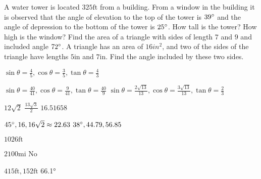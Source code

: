 \begin{Exercise}[title={Right Angled Triangles},label=exRightAngledTriangles]
\Question A water tower is located $325 \mbox{ft}$ from a building. From a window in the building it is observed that the angle of elevation to the top of the tower is $39 \mbox{{\ensuremath{{}^\circ}}}$ and the angle of depression to the bottom of the tower is $25 \mbox{{\ensuremath{{}^\circ}}}$. How tall is the tower? How high is the window? %
\Question Find the area of a triangle with sides of length $7$ and $9$ and included angle $72 \mbox{{\ensuremath{{}^\circ}}}$.%
\Question A triangle has an area of $16 in^{2}\text{,}$ and two of the sides of the triangle have lengths $5 \mbox{in}$ and $7 \mbox{in}$. Find the angle included by these two sides.%

\end{Exercise}%
\begin{Answer}[ref={exRightAngledTriangles}]

\Question %
$\sin  \theta  =\frac{4}{5} ,\cos  \theta  =\frac{3}{5} ,\tan  \theta  =\frac{4}{3}$
\Question %

\begin{tasks}
	\task 	 $\sin  \theta  =\frac{40}{41} ,\cos  \theta  =\frac{9}{41} ,\tan  \theta  =\frac{40}{9}$
	\task 	 $\sin  \theta  =\frac{2 \sqrt{13}}{13} ,\cos  \theta  =\frac{3 \sqrt{13}}{13} ,\tan  \theta  =\frac{2}{3}$
\end{tasks}

\Question %
\begin{tasks}
	\task 	 $12 \sqrt{2}$
	\task 	 $\frac{13 \sqrt{3}}{2}$ 
	\task 	 $16.51658$ 	
\end{tasks}

\Question %
\begin{tasks}
	\task 	 $45 \mbox{{\ensuremath{{}^\circ}}} ,16 ,16 \sqrt{2} \approx 22.63$
	\task 	 $38 \mbox{{\ensuremath{{}^\circ}}} ,44.79 ,56.85$ 
\end{tasks}

\Question %
$1026 \mbox{ft}$

\Question %
\begin{tasks}
	\task 	$2100 \mbox{mi}$	
	\task 	No
\end{tasks}

\Question %
$415 \mbox{ft} ,152 \mbox{ft}$
\Question \ang{66.1}

\end{Answer}%

